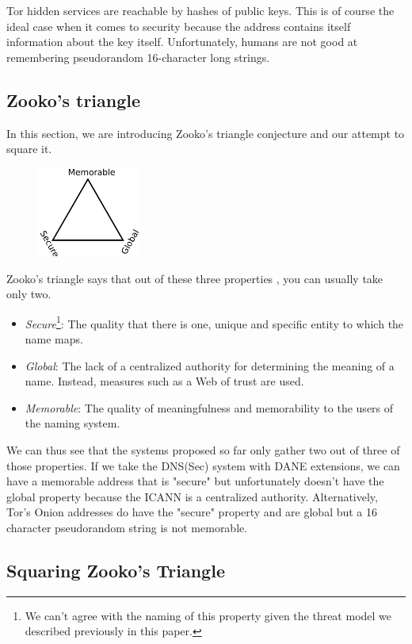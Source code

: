 \documentclass{vldb}
\begin{document}
Tor hidden services are reachable by hashes of public keys. This is of course the ideal case when it comes to security because the address contains itself information about the key itself. Unfortunately, humans are not good at remembering pseudorandom 16-character long strings.

\subsection{Zooko's triangle}
In this section, we are introducing Zooko's triangle conjecture and our attempt to square it.

\begin{figure}[h!]
\centering
\includegraphics[width=0.3\textwidth]{ZookoTriangle.png}
\end{figure}

Zooko's triangle says that out of these three properties \cite{zookoTriangleWikipedia}, you can usually take only two.
\begin{itemize}
\item \emph{Secure}\footnote{We can't agree with the naming of this property given the threat model we described previously in this paper.}: The quality that there is one, unique and specific entity to which the name maps.
\item \emph{Global}: The lack of a centralized authority for determining the meaning of a name. Instead, measures such as a Web of trust are used.
\item \emph{Memorable}: The quality of meaningfulness and memorability to the users of the naming system.
\end{itemize}

We can thus see that the systems proposed so far only gather two out of three of those properties. If we take the DNS(Sec) system with DANE extensions, we can have a memorable address that is "secure" but unfortunately doesn't have the global property because the ICANN is a centralized authority. Alternatively, Tor's Onion addresses do have the "secure" property and are global but a 16 character pseudorandom string is not memorable.

\subsection{Squaring Zooko's Triangle}
\end{document}

